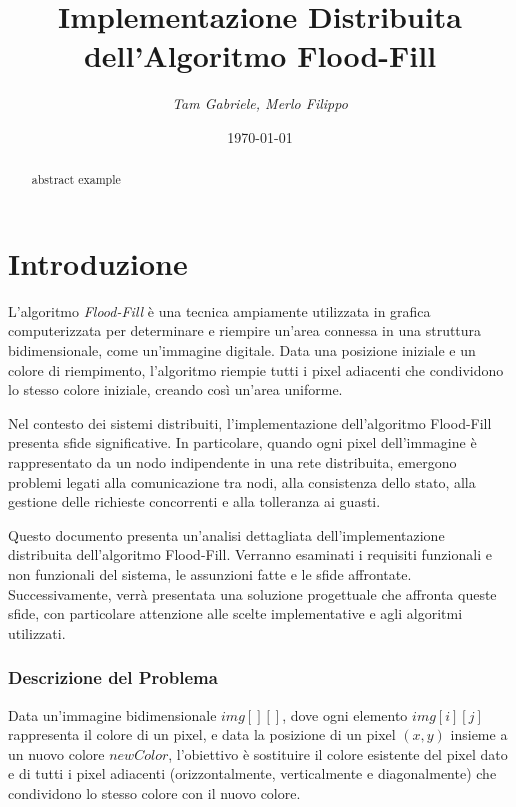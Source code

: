 \documentclass[12pt, a4paper]{report}
\title{\Huge{Implementazione Distribuita dell'Algoritmo Flood-Fill}}
\author{\Large{\textit{Tam Gabriele, Merlo Filippo}}}
\date{\today}
\begin{document}
\maketitle

\newpage
{}
\tableofcontents
\pagebreak

\begin{abstract}
  abstract example
\end{abstract}

\chapter{Introduzione}

L'algoritmo \emph{Flood-Fill} è una tecnica ampiamente utilizzata in grafica computerizzata per determinare e riempire un'area connessa in una struttura bidimensionale, come un'immagine digitale. Data una posizione iniziale e un colore di riempimento, l'algoritmo riempie tutti i pixel adiacenti che condividono lo stesso colore iniziale, creando così un'area uniforme.

Nel contesto dei sistemi distribuiti, l'implementazione dell'algoritmo Flood-Fill presenta sfide significative. In particolare, quando ogni pixel dell'immagine è rappresentato da un nodo indipendente in una rete distribuita, emergono problemi legati alla comunicazione tra nodi, alla consistenza dello stato, alla gestione delle richieste concorrenti e alla tolleranza ai guasti.

Questo documento presenta un'analisi dettagliata dell'implementazione distribuita dell'algoritmo Flood-Fill. Verranno esaminati i requisiti funzionali e non funzionali del sistema, le assunzioni fatte e le sfide affrontate. Successivamente, verrà presentata una soluzione progettuale che affronta queste sfide, con particolare attenzione alle scelte implementative e agli algoritmi utilizzati.

\subsection{Descrizione del Problema}

Data un'immagine bidimensionale $img[][]$, dove ogni elemento $img[i][j]$ rappresenta il colore di un pixel, e data la posizione di un pixel $(x, y)$ insieme a un nuovo colore $newColor$, l'obiettivo è sostituire il colore esistente del pixel dato e di tutti i pixel adiacenti (orizzontalmente, verticalmente e diagonalmente) che condividono lo stesso colore con il nuovo colore.
\end{document}
